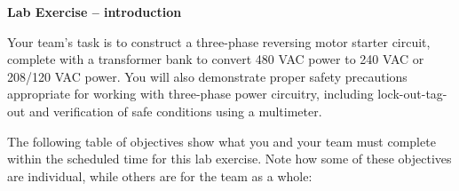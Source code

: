 

\noindent
{\bf Lab Exercise -- introduction}

\vskip 5pt

Your team's task is to construct a three-phase reversing motor starter circuit, complete with a transformer bank to convert 480 VAC power to 240 VAC or 208/120 VAC power.  You will also demonstrate proper safety precautions appropriate for working with three-phase power circuitry, including lock-out-tag-out and verification of safe conditions using a multimeter.

The following table of objectives show what you and your team must complete within the scheduled time for this lab exercise.  Note how some of these objectives are individual, while others are for the team as a whole:



